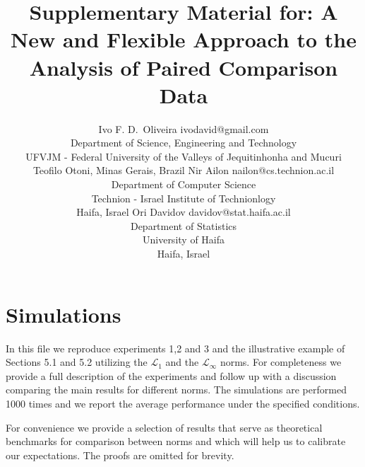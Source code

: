 \documentclass[twoside,11pt]{article}
\begin{document}
\title{Supplementary Material for: A New and Flexible Approach to the Analysis of Paired Comparison Data}



\author{\name Ivo F. D.\ Oliveira \email ivodavid@gmail.com \\
       \addr Department of Science, Engineering and Technology\\
       UFVJM - Federal University of the Valleys of Jequitinhonha and Mucuri\\
       Teofilo Otoni, Minas Gerais, Brazil
       \AND
       \name Nir Ailon \email nailon@cs.technion.ac.il \\
       \addr Department of Computer Science\\
       Technion - Israel Institute of Technionlogy\\
       Haifa, Israel
       \AND
       \name Ori Davidov \email davidov@stat.haifa.ac.il \\
       \addr Department of Statistics\\
       University of Haifa\\
       Haifa, Israel}



\maketitle


\section{Simulations}
In this file we reproduce experiments 1,2 and 3 and the illustrative example of Sections 5.1 and 5.2 utilizing the $\mathcal{L}_1$ and the $\mathcal{L}_{\infty}$ norms. For completeness we provide a full description of the experiments and follow up with a discussion comparing the main results for different norms. The simulations are performed 1000 times and we report the average performance under the specified conditions.

For convenience we provide a selection of results that serve as theoretical benchmarks for comparison between norms and which will help us to calibrate our expectations. The proofs are omitted for brevity. 
\end{document}
